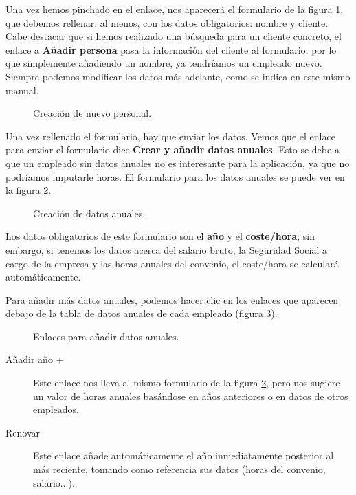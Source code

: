 Una vez hemos pinchado en el enlace, nos aparecerá el formulario de la figura
\ref{fig:form_personal}, que debemos rellenar, al menos, con los datos
obligatorios: nombre y cliente. Cabe destacar que si hemos realizado una
búsqueda para un cliente concreto, el enlace a \textbf{Añadir persona} pasa la
información del cliente al formulario, por lo que simplemente añadiendo un
nombre, ya tendríamos un empleado nuevo. Siempre podemos modificar los datos
más adelante, como se indica en este mismo manual.

\begin{figure}
\centering
{}
\caption{Creación de nuevo personal.}
\label{fig:form_personal}
\end{figure}

Una vez rellenado el formulario, hay que enviar los datos. Vemos que el enlace
para enviar el formulario dice \textbf{Crear y añadir datos anuales}. Esto se
debe a que un empleado sin datos anuales no es interesante para la aplicación,
ya que no podríamos imputarle horas. El formulario para los datos anuales se
puede ver en la figura \ref{fig:form_anuales}.

\begin{figure}
\centering
{}
\caption{Creación de datos anuales.}
\label{fig:form_anuales}
\end{figure}

Los datos obligatorios de este formulario son el \textbf{año} y el
\textbf{coste/hora}; sin embargo, si tenemos los datos acerca del salario
bruto, la Seguridad Social a cargo de la empresa y las horas anuales del
convenio, el coste/hora se calculará automáticamente.

Para añadir más datos anuales, podemos hacer clic en los enlaces que aparecen
debajo de la tabla de datos anuales de cada empleado (figura
\ref{fig:aniadir_anuales}).

\begin{figure}
\centering
{}
\caption{Enlaces para añadir datos anuales.}
\label{fig:aniadir_anuales}
\end{figure}

\begin{description}
 \item [Añadir año +] Este enlace nos lleva al mismo formulario de la figura
\ref{fig:form_anuales}, pero nos sugiere un valor de horas anuales basándose en
años anteriores o en datos de otros empleados.
 \item [Renovar] Este enlace añade automáticamente el año inmediatamente
posterior al más reciente, tomando como referencia sus datos (horas del
convenio, salario...).
\end{description}

